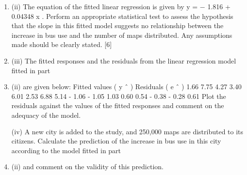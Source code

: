 \documentclass[a4paper,12pt]{article}
\begin{document}
\begin{enumerate}
\item (ii) The equation of the fitted linear regression is given by y = − 1.816 + 0.04348 x .
Perform an appropriate statistical test to assess the hypothesis that the slope in this fitted model suggests no relationship between the increase in bus use and the number of maps distributed. Any assumptions made should be clearly
stated.
[6]
\item (iii) The fitted responses and the residuals from the linear regression model fitted
in part \item (ii) are given below:
Fitted values ( y ˆ )
Residuals ( e ˆ )
1.66 7.75 4.27 3.40 6.01 2.53 6.88 5.14
- 1.06 - 1.05 1.03 0.60 0.54 - 0.38 - 0.28 0.61
Plot the residuals against the values of the fitted responses and comment on
the adequacy of the model.

(iv)
A new city is added to the study, and 250,000 maps are distributed to its
citizens.
Calculate the prediction of the increase in bus use in this city according to the
model fitted in part \item (ii) and comment on the validity of this prediction.




\end{enumerate}
\end{document}
